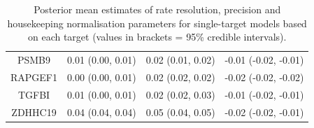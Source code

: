 \documentclass[../thesis.tex]{subfiles}
\begin{document}
\begin{table}[ht]
\begin{tabular}{cccc}
  PSMB9 & 0.01 (0.00, 0.01) & 0.02 (0.01, 0.02) & -0.01 (-0.02, -0.01) \\ 
  RAPGEF1 & 0.00 (0.00, 0.01) & 0.02 (0.02, 0.02) & -0.02 (-0.02, -0.02) \\ 
  TGFBI & 0.01 (0.00, 0.01) & 0.02 (0.02, 0.03) & -0.01 (-0.02, -0.01) \\ 
  ZDHHC19 & 0.04 (0.04, 0.04) & 0.05 (0.04, 0.05) & -0.02 (-0.02, -0.01) \\ 
   \hline
\end{tabular}
\caption{Posterior mean estimates of rate resolution, precision and housekeeping normalisation parameters for single-target models based on each target (values in brackets = 95\% credible intervals). \label{tab:single_target_rate_models_summary}} 
\end{table}
\end{document}
